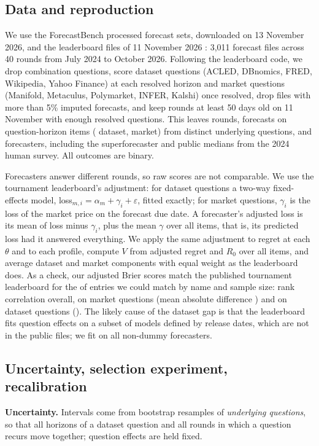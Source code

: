 \documentclass[10pt]{article}
\newcommand{\V}{V}
\begin{document}
\subsection{Data and reproduction}
We use the ForecastBench processed forecast sets, downloaded on 13 November 2026, and the leaderboard files of 11 November 2026 \cite{karger2025}: 3,011 forecast files across 40 rounds from July 2024 to October 2026. Following the leaderboard code, we drop combination questions, score dataset questions (ACLED, DBnomics, FRED, Wikipedia, Yahoo Finance) at each resolved horizon and market questions (Manifold, Metaculus, Polymarket, INFER, Kalshi) once resolved, drop \nFilesDropped{} files with more than 5\% imputed forecasts, and keep rounds at least 50 days old on 11 November with enough resolved questions. This leaves \nRounds{} rounds, \nForecasts{} forecasts on \nItems{} question-horizon items (\nItemsDataset{} dataset, \nItemsMarket{} market) from \nQuestions{} distinct underlying questions, and \nListed{} forecasters, including the superforecaster and public medians from the 2024 human survey. All outcomes are binary.

Forecasters answer different rounds, so raw scores are not comparable. We use the tournament leaderboard's adjustment: for dataset questions a two-way fixed-effects model, loss$_{m,i}=\alpha_m+\gamma_i+\varepsilon$, fitted exactly; for market questions, $\gamma_i$ is the loss of the market price on the forecast due date. A forecaster's adjusted loss is its mean of loss minus $\gamma_i$, plus the mean $\gamma$ over all items, that is, its predicted loss had it answered everything. We apply the same adjustment to regret at each $\theta$ and to each profile, compute $\V$ from adjusted regret and $R_0$ over all items, and average dataset and market components with equal weight as the leaderboard does. As a check, our adjusted Brier scores match the published tournament leaderboard for the \reproMatched{} of \reproPublished{} entries we could match by name and sample size: rank correlation \reproRhoOverall{} overall, \reproRhoMarket{} on market questions (mean absolute difference \reproMadMarket) and \reproRhoDataset{} on dataset questions (\reproMadDataset). The likely cause of the dataset gap is that the leaderboard fits question effects on a subset of models defined by release dates, which are not in the public files; we fit on all non-dummy forecasters.

\subsection{Uncertainty, selection experiment, recalibration}
\textbf{Uncertainty.} Intervals come from \nBoot{} bootstrap resamples of \emph{underlying questions}, so that all horizons of a dataset question and all rounds in which a question recurs move together; question effects are held fixed.
\end{document}
